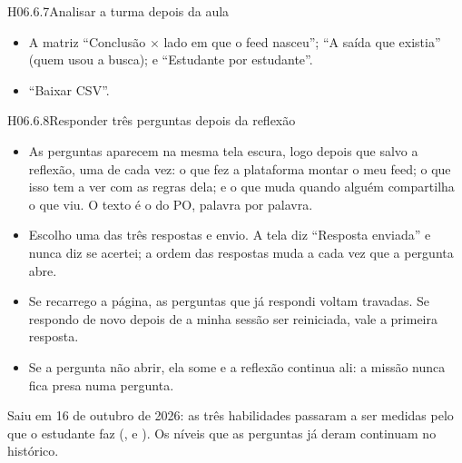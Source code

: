 \begin{historia}{H06.6.7}{Analisar a turma depois da aula}{\pronto}
\aceite
\begin{itemize}
  \item A matriz \enquote{Conclusão $\times$ lado em que o feed nasceu};
    \enquote{A saída que existia} (quem usou a busca); e \enquote{Estudante por
    estudante}.
  \item \enquote{Baixar CSV}.
\end{itemize}
\end{historia}

\begin{historia}{H06.6.8}{Responder três perguntas depois da reflexão}{\arquivada}
\aceite
\begin{itemize}
  \item As perguntas aparecem na mesma tela escura, logo depois que salvo a
    reflexão, uma de cada vez: o que fez a plataforma montar o meu feed; o que
    isso tem a ver com as regras dela; e o que muda quando alguém compartilha o
    que viu. O texto é o do PO, palavra por palavra.
  \item Escolho uma das três respostas e envio. A tela diz \enquote{Resposta
    enviada} e nunca diz se acertei; a ordem das respostas muda a cada vez que
    a pergunta abre.
  \item Se recarrego a página, as perguntas que já respondi voltam travadas.
    Se respondo de novo depois de a minha sessão ser reiniciada, vale a
    primeira resposta.
  \item Se a pergunta não abrir, ela some e a reflexão continua ali: a missão
    nunca fica presa numa pergunta.
\end{itemize}
Saiu em 16 de outubro de 2026: as três habilidades passaram a ser medidas pelo
que o estudante faz (,  e ). Os níveis
que as perguntas já deram continuam no histórico.
\end{historia}

